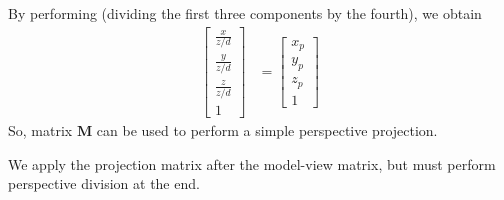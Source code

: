 \documentclass[../COS3712_Notes.tex]{subfiles}
\begin{document}
      By performing 
      (dividing the first three components by the fourth),
      we obtain
      \begin{align*}
        \begin{bmatrix}
          \frac{x}{z/d} \\
          \frac{y}{z/d} \\
          \frac{z}{z/d} \\
          1
        \end{bmatrix} &=
        \begin{bmatrix}
          x_p \\
          y_p \\
          z_p \\
          1
        \end{bmatrix}
      \end{align*}
      So, matrix $\mathbf{M}$ can be used to perform a simple perspective projection.

      We apply the projection matrix after the model-view matrix, but must perform
      perspective division at the end.
\end{document}
